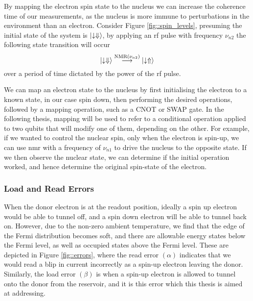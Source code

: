 		By mapping the electron spin state to the nucleus we can increase the coherence time of our measurements, as the nucleus is more immune to perturbations in the environment than an electron. Consider Figure \ref{fig::spin_levels}, presuming the initial state of the system is $\ket{\downarrow \Downarrow}$, by applying an \gls{rf} pulse with frequency $\nu_{n2}$ the following state transition will occur 
		$$\ket{\downarrow \Downarrow} \overset{\textrm{NMR($\nu_{n2}$)}}{\longrightarrow }\ket{\downarrow \Uparrow}$$
		over a period of time dictated by the power of the \gls{rf} pulse.
		
		We can map an electron state to the nucleus by first initialising the electron to a known state, in our case spin down, then performing the desired operations, followed by a mapping operation, such as a CNOT or SWAP gate. In the following thesis, mapping will be used to refer to a conditional operation applied to two qubits that will modify one of them, depending on the other. For example, if we wanted to control the nuclear spin, only when the electron is spin-up, we can use \gls{nmr} with a frequency of $\nu_{n1}$ to drive the nucleus to the opposite state. If we then observe the nuclear state, we can determine if the initial operation worked, and hence determine the original spin-state of the electron.
		
	\subsubsection{Load and Read Errors}
		\label{sec::load_error}
		When the donor electron is at the readout position, ideally a spin up electron would be able to tunnel off, and a spin down electron will be able to tunnel back on. However, due to the non-zero ambient temperature, we find that the edge of the Fermi distribution becomes soft, and there are allowable energy states below the Fermi level, as well as occupied states above the Fermi level. These are depicted in Figure \ref{fig::errors}, where the read error $(\alpha)$ indicates that we would read a blip in current incorrectly as a spin-up electron leaving the donor. Similarly, the load error $(\beta)$ is when a spin-up electron is allowed to tunnel onto the donor from the reservoir, and it is this error which this thesis is aimed at addressing. 
		
